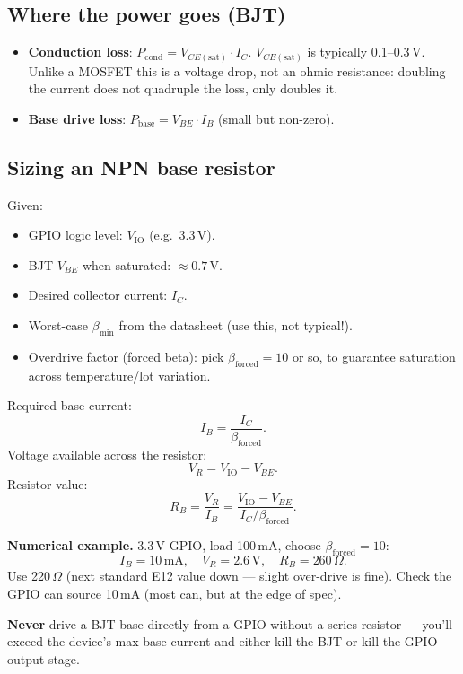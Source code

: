 \documentclass[11pt,a4paper]{article}
\begin{document}
\subsection{Where the power goes (BJT)}

\begin{itemize}[leftmargin=*]
    \item \textbf{Conduction loss}: $P_{\text{cond}} = V_{CE(\text{sat})} \cdot I_C$.
    $V_{CE(\text{sat})}$ is typically 0.1--0.3\,V. Unlike a MOSFET this is
    a voltage drop, not an ohmic resistance: doubling the current does not
    quadruple the loss, only doubles it.
    \item \textbf{Base drive loss}: $P_{\text{base}} = V_{BE} \cdot I_B$
    (small but non-zero).
\end{itemize}

\subsection{Sizing an NPN base resistor}

Given:
\begin{itemize}[leftmargin=*]
    \item GPIO logic level: $V_{\text{IO}}$ (e.g.\ 3.3\,V).
    \item BJT $V_{BE}$ when saturated: $\approx 0.7$\,V.
    \item Desired collector current: $I_C$.
    \item Worst-case $\beta_{\min}$ from the datasheet (use this, not
    typical!).
    \item Overdrive factor (forced beta): pick $\beta_{\text{forced}} = 10$
    or so, to guarantee saturation across temperature/lot variation.
\end{itemize}

Required base current:
\[
I_B = \frac{I_C}{\beta_{\text{forced}}}.
\]
Voltage available across the resistor:
\[
V_R = V_{\text{IO}} - V_{BE}.
\]
Resistor value:
\[
R_B = \frac{V_R}{I_B} = \frac{V_{\text{IO}} - V_{BE}}{I_C / \beta_{\text{forced}}}.
\]

\textbf{Numerical example.} 3.3\,V GPIO, load 100\,mA, choose
$\beta_{\text{forced}} = 10$:
\[
I_B = 10\,\text{mA}, \quad V_R = 2.6\,\text{V}, \quad
R_B = 260\,\Omega.
\]
Use 220\,$\Omega$ (next standard E12 value down --- slight over-drive is
fine). Check the GPIO can source 10\,mA (most can, but at the edge of
spec).

\begin{warning}
\textbf{Never} drive a BJT base directly from a GPIO without a series
resistor --- you'll exceed the device's max base current and either kill
the BJT or kill the GPIO output stage.
\end{warning}
\end{document}

